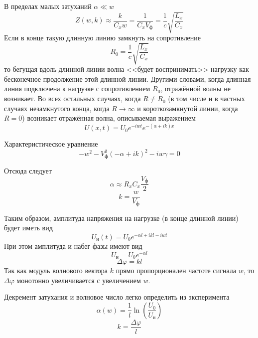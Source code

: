В пределах малых затуханий $ \alpha\ll w$ 
\[
    Z(w, k) \approx \frac{k}{C_{x}w}= \frac{1}{C_{x}V_{\text{ф}}} = \frac{1}{c}\sqrt{\frac{L_{x}}{C_{x}}}
\]
Если в конце такую длинную линию замкнуть на сопротивление
\[
    R_{0} = \frac{1}{c}\sqrt{\frac{L_{x}}{C_{x}}}
\]
то бегущая вдоль длинной линии волна <<будет воспринимать>> нагрузку как бесконечное
продолжение этой длинной линии. Другими словами, когда длинная линия подключена к
нагрузке с сопротивлением $R_{0}$, отражённой волны не возникает. Во всех остальных
случаях, когда $R \neq R_{0}$  (в том числе и в частных случаях незамкнутого конца, когда
$R \to \infty$  и короткозамкнутой линии, когда $R=0$)  возникает отражённая волна,
описываемая выражением
\[
    U(x, t) = U_{0}e^{-iwt}e^{-\left( \alpha + ik\right)x}
\]

Характеристическое уравнение
\[
    -w^{2} - V_{\text{ф}}^{2}\left(- \alpha + ik\right)^{2} - iw \gamma = 0
\]

Отсюда следует
\[
    \alpha\approx R_{x}C_{x}\frac{V_{\text{ф}}}{2}
\]
\[
    k=\frac{w}{V_{\text{ф}}}
\]

Таким образом, амплитуда напряжения на нагрузке (в конце длинной линии) будет иметь вид
\[
    U_{\text{н}}(t) = U_{0}e^{- \alpha l + ikl - iwt}
\]
При этом амплитуда и набег фазы имеют вид
\[
    U_{\text{н}} = U_{0}e^{- \alpha l}
\]
\[
    \Delta \varphi = kl
\]
Так как модуль волнового вектора $k$ прямо пропорционален частоте сигнала $w$, то
$ \Delta \varphi$    монотонно увеличивается с увеличением $w$.

Декремент затухания и волновое число легко определить из эксперимента
\[
    \alpha(w) = \frac{1}{l}\ln\left(\frac{U_{0}}{U_{\text{н}}}\right)   
\]
\[
    k=\frac{ \Delta \varphi}{l}
\]

